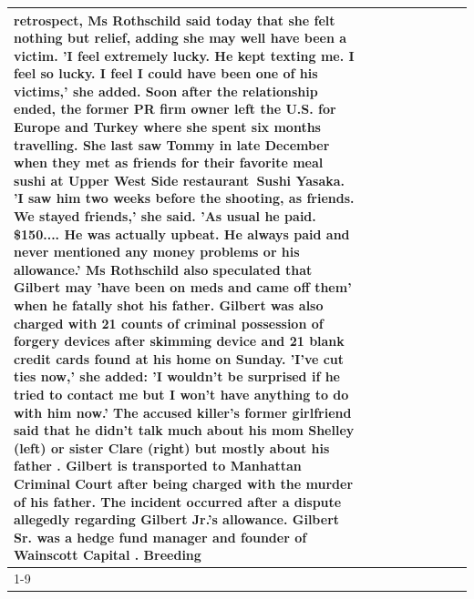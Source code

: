 \begin{table}[H]
\begin{tabular}{lllrlllll}
retrospect, Ms Rothschild said today that she felt nothing but relief, adding she may well have been a victim. 'I feel extremely lucky. He kept texting me. I feel so lucky. I feel I could have been one of his victims,' she added. Soon after the relationship ended, the former PR firm owner left the U.S. for Europe and Turkey where she spent six months  travelling. She last saw Tommy in late December when they met as friends for their favorite meal sushi at Upper West Side restaurant Sushi Yasaka. 'I saw him two weeks before the shooting, as friends. We stayed friends,' she said. 'As usual he paid. \$150.... He was actually upbeat. He always paid and never mentioned any money problems or his allowance.' Ms Rothschild also speculated that Gilbert may 'have been on meds and came off them' when he fatally shot his father. Gilbert was also charged with 21 counts of criminal possession of forgery devices after skimming device and 21 blank credit cards found at his home on Sunday. 'I've cut ties now,' she added: 'I wouldn’t be surprised if he tried to contact me but I won’t have anything to do with him now.' The accused killer's former girlfriend said that he didn't talk much about his mom Shelley (left) or sister Clare (right) but mostly about his father . Gilbert is transported to Manhattan Criminal Court  after being charged with the murder of his father. The incident occurred after a dispute allegedly regarding Gilbert Jr.'s allowance. Gilbert Sr. was a hedge fund manager and founder of Wainscott Capital . Breeding \\
\cline{1-9}

\end{tabular}
\end{table}
